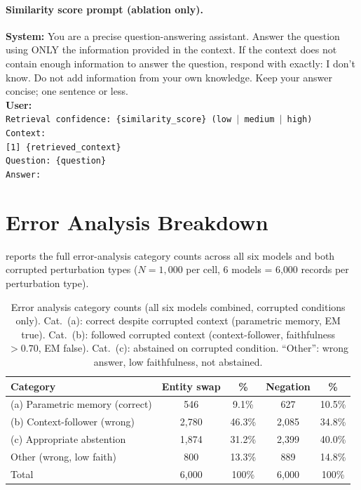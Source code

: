 \documentclass[11pt]{article}
\begin{document}
\paragraph{Similarity score prompt (ablation only).}
\begin{examplebox}
\small
\textbf{System:} You are a precise question-answering assistant. Answer the question
using ONLY the information provided in the context. If the context does not contain
enough information to answer the question, respond with exactly: I don't know. Do not
add information from your own knowledge. Keep your answer concise; one sentence or
less.\\[6pt]
\textbf{User:}\\
\texttt{Retrieval confidence: \{similarity\_score\} (low $|$ medium $|$ high)}\\
\texttt{Context:}\\
\texttt{[1] \{retrieved\_context\}}\\[4pt]
\texttt{Question: \{question\}}\\[4pt]
\texttt{Answer:}
\end{examplebox}

\FloatBarrier
\section{Error Analysis Breakdown}
\label{app:error-analysis}

 reports the full error-analysis category counts across all six
models and both corrupted perturbation types ($N=1{,}000$ per cell, 6 models = 6{,}000
records per perturbation type).

\begin{table}[htbp]
\centering
\caption{Error analysis category counts (all six models combined, corrupted conditions
  only). Cat.\ (a): correct despite corrupted context (parametric memory, EM true).
  Cat.\ (b): followed corrupted context (context-follower, faithfulness $> 0.70$, EM
  false). Cat.\ (c): abstained on corrupted condition. ``Other'': wrong answer, low
  faithfulness, not abstained.}
\label{tab:error-breakdown}
\begin{tabular}{lcccc}
\toprule
\textbf{Category} & \textbf{Entity swap} & \textbf{\%} & \textbf{Negation} & \textbf{\%} \\
\midrule
(a) Parametric memory (correct) &   546 &  9.1\% &   627 & 10.5\% \\
(b) Context-follower (wrong)    & 2{,}780 & 46.3\% & 2{,}085 & 34.8\% \\
(c) Appropriate abstention      & 1{,}874 & 31.2\% & 2{,}399 & 40.0\% \\
Other (wrong, low faith)        &   800 & 13.3\% &   889 & 14.8\% \\
\midrule
Total                           & 6{,}000 & 100\% & 6{,}000 & 100\% \\
\bottomrule
\end{tabular}
\end{table}
\end{document}
